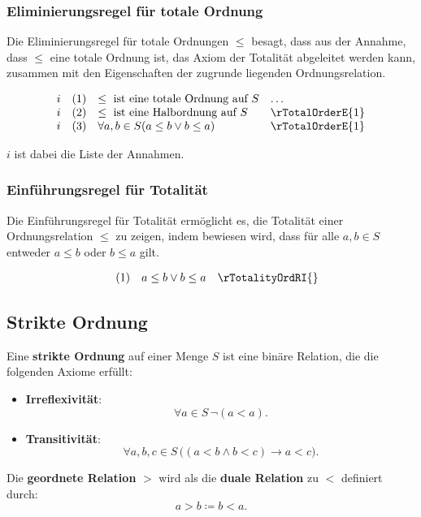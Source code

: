 \documentclass[main.tex]{subfiles}
\begin{document}
\subsubsection*{Eliminierungsregel für totale Ordnung}
\label{rule:rTotalOrderE}
Die Eliminierungsregel für totale Ordnungen \(\leq\) besagt, dass aus der Annahme, dass \(\leq\) eine totale Ordnung ist, das Axiom der Totalität abgeleitet werden kann, zusammen mit den Eigenschaften der zugrunde liegenden Ordnungsrelation.

\[
\begin{array}{llll}
    i       & (1) & \leq \text{ ist eine totale Ordnung auf } S & \dots \\
    i       & (2) & \leq \text{ ist eine Halbordnung auf } S & \rTotalOrderE{1} \\
    i       & (3) & \forall a, b \in S (a \leq b \lor b \leq a) & \rTotalOrderE{1}
\end{array}
\]

\(i\) ist dabei die Liste der Annahmen.

\subsubsection*{Einführungsregel für Totalität}
\label{rule:rTotalityOrdRI}
Die Einführungsregel für Totalität ermöglicht es, die Totalität einer Ordnungsrelation \(\leq\) zu zeigen, indem bewiesen wird, dass für alle \(a, b \in S\) entweder \(a \leq b\) oder \(b \leq a\) gilt.

\[
\begin{array}{llll}
           & (1) & a \leq b \lor b \leq a & \rTotalityOrdRI{}
\end{array}
\]

\subsection{Strikte Ordnung}

\begin{definition}
    Eine \textbf{strikte Ordnung} auf einer Menge \( S \) ist eine binäre Relation, die die folgenden Axiome erfüllt:
    
    \begin{itemize}
        \item \textbf{Irreflexivität}:
        \[
        \forall a \in S \, \neg (a < a).
        \]
        
        \item \textbf{Transitivität}: 
        \[
        \forall a, b, c \in S \, \big( (a < b \land b < c) \rightarrow a < c \big).
        \]
    \end{itemize}

    Die \textbf{geordnete Relation} \(>\) wird als die \textbf{duale Relation} zu \(<\) definiert durch:
    \[
    a > b \coloneqq b < a.
    \]
\end{definition}
\end{document}
